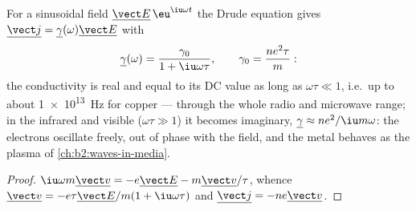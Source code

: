 \begin{proposition}\label{prop:b2:charges-currents-conduction:acdrude}
For a sinusoidal field $\underline{\vect E}\,\eu^{\iu\omega t}$ the Drude equation
gives $\underline{\vect j} = \underline\gamma(\omega)\underline{\vect E}$ with
\[
\underline\gamma(\omega) = \frac{\gamma_0}{1 + \iu\omega\tau} , \qquad \gamma_0 = \frac{ne^2\tau}{m} :
\]
the conductivity is real and equal to its DC value as long as $\omega\tau
\ll 1$, i.e.\ up to about \qty{1e13}{Hz} for copper --- through the whole
radio and microwave range; in the infrared and visible ($\omega\tau \gg 1$)
it becomes imaginary, $\underline\gamma \approx ne^2/\iu m\omega$: the electrons
oscillate freely, out of phase with the field, and the metal behaves
as the plasma of \cref{ch:b2:waves-in-media}.
\end{proposition}

\begin{proof}
$\iu\omega m\underline{\vect v} = -e\underline{\vect E} - m\underline{\vect v}/\tau$, whence
$\underline{\vect v} = -e\tau\underline{\vect E}/m(1 + \iu\omega\tau)$ and $\underline{\vect j}
= -ne\underline{\vect v}$.
\end{proof}

